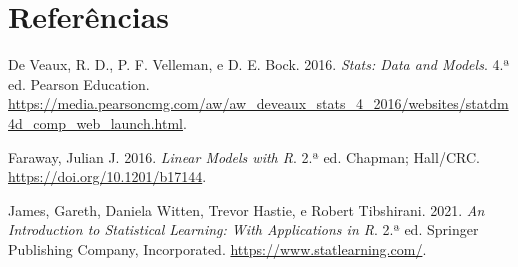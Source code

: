 \documentclass[
  letterpaper,
  DIV=11,
  numbers=noendperiod]{scrreprt}
\newlength{\cslhangindent}
\newenvironment{CSLReferences}[2] %
 {\begin{list}{}{%
  \setlength{\itemindent}{0pt}
  \setlength{\leftmargin}{0pt}
  \setlength{\parsep}{0pt}
  \ifodd #1
   \setlength{\leftmargin}{\cslhangindent}
   \setlength{\itemindent}{-1\cslhangindent}
  \fi
  \setlength{\itemsep}{#2\baselineskip}}}
 {\end{list}}
\begin{document}

\chapter*{Referências}\label{referuxeancias}


\label{refs}
\begin{CSLReferences}{1}{0}
De Veaux, R. D., P. F. Velleman, e D. E. Bock. 2016. \emph{Stats: Data
and Models}. 4.ª ed. Pearson Education.
\url{https://media.pearsoncmg.com/aw/aw_deveaux_stats_4_2016/websites/statdm4d_comp_web_launch.html}.

Faraway, Julian J. 2016. \emph{Linear Models with R}. 2.ª ed. Chapman;
Hall/CRC. \url{https://doi.org/10.1201/b17144}.

James, Gareth, Daniela Witten, Trevor Hastie, e Robert Tibshirani. 2021.
\emph{An Introduction to Statistical Learning: With Applications in R}.
2.ª ed. Springer Publishing Company, Incorporated.
\url{https://www.statlearning.com/}.

\end{CSLReferences}
\end{document}
